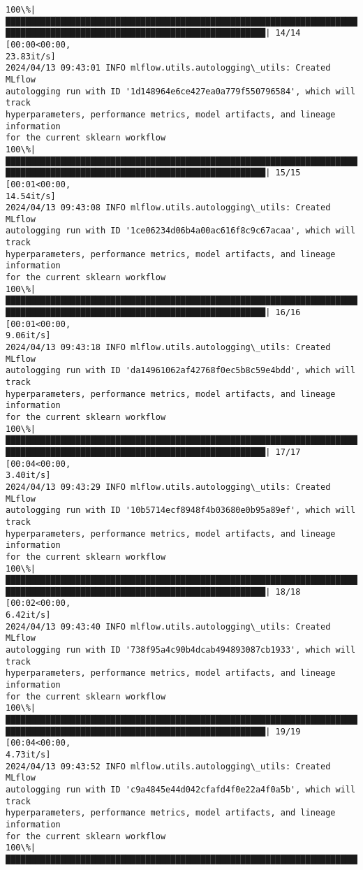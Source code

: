 \documentclass[11pt]{article}
\begin{document}
\begin{Verbatim}[commandchars=\\\{\}]
100\%|███████████████████████████████████████████████████████████████████████████
████████████████████████████████████████████████████| 14/14 [00:00<00:00,
23.83it/s]
2024/04/13 09:43:01 INFO mlflow.utils.autologging\_utils: Created MLflow
autologging run with ID '1d148964e6ce427ea0a779f550796584', which will track
hyperparameters, performance metrics, model artifacts, and lineage information
for the current sklearn workflow
100\%|███████████████████████████████████████████████████████████████████████████
████████████████████████████████████████████████████| 15/15 [00:01<00:00,
14.54it/s]
2024/04/13 09:43:08 INFO mlflow.utils.autologging\_utils: Created MLflow
autologging run with ID '1ce06234d06b4a00ac616f8c9c67acaa', which will track
hyperparameters, performance metrics, model artifacts, and lineage information
for the current sklearn workflow
100\%|███████████████████████████████████████████████████████████████████████████
████████████████████████████████████████████████████| 16/16 [00:01<00:00,
9.06it/s]
2024/04/13 09:43:18 INFO mlflow.utils.autologging\_utils: Created MLflow
autologging run with ID 'da14961062af42768f0ec5b8c59e4bdd', which will track
hyperparameters, performance metrics, model artifacts, and lineage information
for the current sklearn workflow
100\%|███████████████████████████████████████████████████████████████████████████
████████████████████████████████████████████████████| 17/17 [00:04<00:00,
3.40it/s]
2024/04/13 09:43:29 INFO mlflow.utils.autologging\_utils: Created MLflow
autologging run with ID '10b5714ecf8948f4b03680e0b95a89ef', which will track
hyperparameters, performance metrics, model artifacts, and lineage information
for the current sklearn workflow
100\%|███████████████████████████████████████████████████████████████████████████
████████████████████████████████████████████████████| 18/18 [00:02<00:00,
6.42it/s]
2024/04/13 09:43:40 INFO mlflow.utils.autologging\_utils: Created MLflow
autologging run with ID '738f95a4c90b4dcab494893087cb1933', which will track
hyperparameters, performance metrics, model artifacts, and lineage information
for the current sklearn workflow
100\%|███████████████████████████████████████████████████████████████████████████
████████████████████████████████████████████████████| 19/19 [00:04<00:00,
4.73it/s]
2024/04/13 09:43:52 INFO mlflow.utils.autologging\_utils: Created MLflow
autologging run with ID 'c9a4845e44d042cfafd4f0e22a4f0a5b', which will track
hyperparameters, performance metrics, model artifacts, and lineage information
for the current sklearn workflow
100\%|███████████████████████████████████████████████████████████████████████████

\end{Verbatim}
\end{document}
